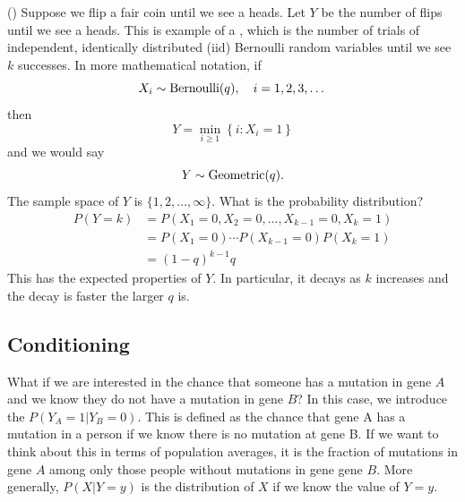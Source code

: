 \begin{example}(\cite[Example 2.3.4]{evans})
Suppose we flip a fair coin until we see a heads. Let $Y$ be the number of flips until we see a heads. This is example of a  , which is the number of trials of independent, identically distributed (iid) Bernoulli random variables until we see $k$ successes. In more mathematical notation, if
\begin{equation*}
X_i \sim {\rm Bernoulli}(q), \quad i = 1,2,3,\dots
\end{equation*}
then 
\begin{equation*}
Y = \min_{i\ge1}\left\{i:X_i=1 \right\}
\end{equation*} 
and we would say 
\begin{equation*}
Y \sim {\rm Geometric}(q).
\end{equation*}
The sample space of $Y$ is $\{1,2,\dots,\infty\}$. What is the probability distribution? 
\begin{align*}
P(Y=k) &= P(X_1=0,X_2=0,\dots,X_{k-1}=0,X_k=1) \\
&= P(X_1 = 0) \cdots  P(X_{k-1}=0)P(X_k=1) \\
&= (1-q)^{k-1}q
\end{align*}
This has the expected properties of $Y$. In particular, it decays as $k$ increases and the decay is faster the larger $q$ is. 

\end{example}






\subsection{Conditioning}
 What if we are interested in the chance that someone has a mutation in gene $A$ and we know they do not have a mutation in gene $B$?  In this case, we introduce the  $P(Y_A=1|Y_B=0)$. This is defined as the chance that gene A has a mutation in a person if we know there is no mutation at gene B. If we want to think about this in terms of population averages, it is the fraction of mutations in gene $A$ among only those people without mutations in gene gene $B$. 
 More generally, $P(X|Y=y)$ is the distribution of $X$ if we know the value of $Y=y$. 
 
